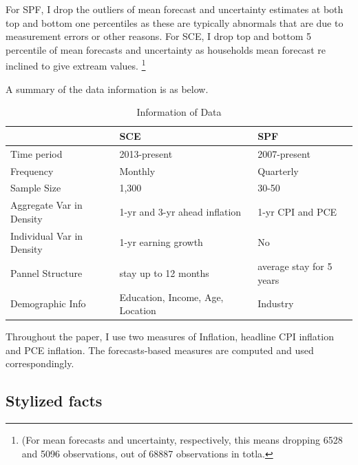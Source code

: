 \documentclass[]{article}
\begin{document}
For SPF, I drop the outliers of mean forecast and uncertainty estimates at both top and bottom one percentiles as these are typically abnormals that are due to measurement errors or other reasons.   For SCE, I drop top and bottom 5 percentile of mean forecasts and uncertainty as households mean forecast re inclined to give extream values. \footnote{(For mean forecasts and uncertainty, respectively, this means dropping 6528 and 5096 observations, out of 68887 observations in totla.}


A summary of the data information is as below. 

\begin{table}[ht]
			\caption{Information of Data}
			\label{DataInfo}
	\begin{tabular}{lll} 

		\hline 
		& SCE & SPF        \\
		\hline 
		Time period                                    & 2013-present                            & 2007-present             \\
		Frequency                                      & Monthly                                 & Quarterly                \\
		Sample Size                                    & 1,300                                   & 30-50                    \\
		Aggregate Var in Density                       & 1-yr  and 3-yr ahead inflation          & 1-yr CPI and PCE         \\
		Individual Var in Density                      & 1-yr earning growth                     & No                       \\
		Pannel Structure                               & stay up to 12 months                    & average stay for 5 years \\
		Demographic Info                        & Education, Income, Age, Location        & Industry    \\
		\hline 
	\end{tabular}
\end{table}

Throughout the paper, I use two measures of Inflation, headline CPI inflation and PCE inflation. The forecasts-based measures are computed and used correspondingly.  

\subsection{Stylized facts}
\end{document}
